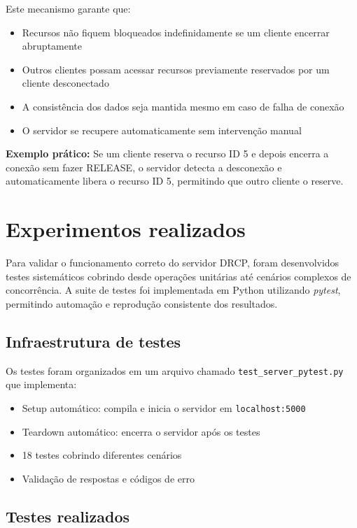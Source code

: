 \documentclass{article}
\begin{document}
Este mecanismo garante que:
\begin{itemize}
    \item Recursos não fiquem bloqueados indefinidamente se um cliente encerrar abruptamente
    \item Outros clientes possam acessar recursos previamente reservados por um cliente desconectado
    \item A consistência dos dados seja mantida mesmo em caso de falha de conexão
    \item O servidor se recupere automaticamente sem intervenção manual
\end{itemize}

\textbf{Exemplo prático:} Se um cliente reserva o recurso ID 5 e depois encerra a conexão sem fazer RELEASE, o servidor detecta a desconexão e automaticamente libera o recurso ID 5, permitindo que outro cliente o reserve.

\section{Experimentos realizados}

Para validar o funcionamento correto do servidor DRCP, foram desenvolvidos testes sistemáticos cobrindo desde operações unitárias até cenários complexos de concorrência. A suite de testes foi implementada em Python utilizando \textit{pytest}, permitindo automação e reprodução consistente dos resultados.

\subsection{Infraestrutura de testes}

Os testes foram organizados em um arquivo chamado \texttt{test\_server\_pytest.py} que implementa:
\begin{itemize}
    \item Setup automático: compila e inicia o servidor em \texttt{localhost:5000}
    \item Teardown automático: encerra o servidor após os testes
    \item 18 testes cobrindo diferentes cenários
    \item Validação de respostas e códigos de erro
\end{itemize}

\subsection{Testes realizados}
\end{document}

